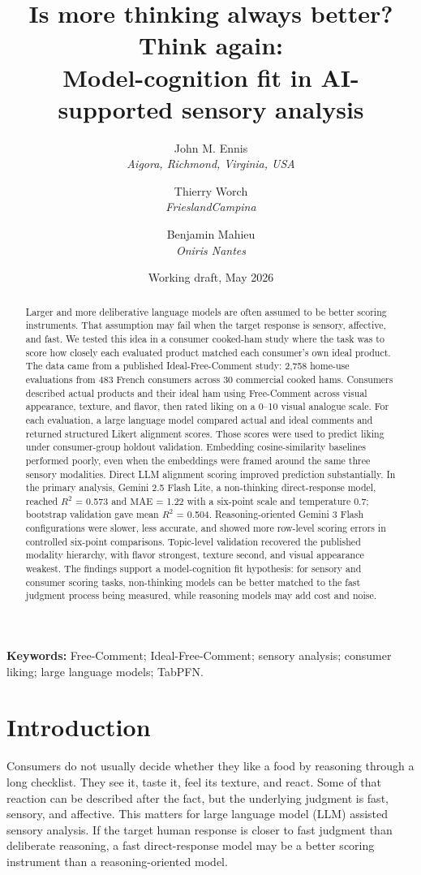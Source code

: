 \documentclass[12pt]{article}
\title{Is more thinking always better? Think again:\\
\large Model-cognition fit in AI-supported sensory analysis}
\author{
John M. Ennis\\
\textit{Aigora, Richmond, Virginia, USA}
\and
Thierry Worch\\
\textit{FrieslandCampina}
\and
Benjamin Mahieu\\
\textit{Oniris Nantes}
}
\date{Working draft, May 2026}
\newcommand{\Rtwo}{\ensuremath{R^2}}
\newcommand{\mae}{\ensuremath{\mathrm{MAE}}}
\newcommand{\fl}{Gemini 2.5 Flash Lite}
\newcommand{\gthree}{Gemini 3 Flash}
\begin{document}
\maketitle

\begin{abstract}
Larger and more deliberative language models are often assumed to be better scoring instruments. That assumption may fail when the target response is sensory, affective, and fast. We tested this idea in a consumer cooked-ham study where the task was to score how closely each evaluated product matched each consumer's own ideal product. The data came from a published Ideal-Free-Comment study: 2,758 home-use evaluations from 483 French consumers across 30 commercial cooked hams. Consumers described actual products and their ideal ham using Free-Comment across visual appearance, texture, and flavor, then rated liking on a 0--10 visual analogue scale. For each evaluation, a large language model compared actual and ideal comments and returned structured Likert alignment scores. Those scores were used to predict liking under consumer-group holdout validation. Embedding cosine-similarity baselines performed poorly, even when the embeddings were framed around the same three sensory modalities. Direct LLM alignment scoring improved prediction substantially. In the primary analysis, \fl{}, a non-thinking direct-response model, reached \Rtwo{} = 0.573 and \mae{} = 1.22 with a six-point scale and temperature 0.7; bootstrap validation gave mean \Rtwo{} = 0.504. Reasoning-oriented \gthree{} configurations were slower, less accurate, and showed more row-level scoring errors in controlled six-point comparisons. Topic-level validation recovered the published modality hierarchy, with flavor strongest, texture second, and visual appearance weakest. The findings support a model-cognition fit hypothesis: for sensory and consumer scoring tasks, non-thinking models can be better matched to the fast judgment process being measured, while reasoning models may add cost and noise.
\end{abstract}

\noindent\textbf{Keywords:} Free-Comment; Ideal-Free-Comment; sensory analysis; consumer liking; large language models; TabPFN.

\section{Introduction}

Consumers do not usually decide whether they like a food by reasoning through a long checklist. They see it, taste it, feel its texture, and react. Some of that reaction can be described after the fact, but the underlying judgment is fast, sensory, and affective. This matters for large language model (LLM) assisted sensory analysis. If the target human response is closer to fast judgment than deliberate reasoning, a fast direct-response model may be a better scoring instrument than a reasoning-oriented model.
\end{document}
